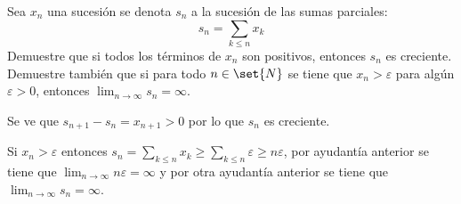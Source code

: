 \documentclass{ayudantia}
\begin{document}
\begin{prob}
    Sea \(x_n\) una sucesión se denota \(s_n\) a la sucesión de las sumas parciales:
    \begin{equation*}
        s_n=\sum_{k\leq n}x_k
    \end{equation*}
    Demuestre que si todos los términos de \(x_n\) son positivos, entonces \(s_n\) es creciente. Demuestre también que si para todo \(n\in\set{N}\) se tiene que \(x_n>\varepsilon\) para algún \(\varepsilon>0\), entonces \(\lim_{n\rightarrow\infty}s_n=\infty\).
\end{prob}

\begin{ans}
    \begin{sol}
        Se ve que \(s_{n+1}-s_n=x_{n+1}>0\) por lo que \(s_n\) es creciente.

        Si \(x_n>\varepsilon\) entonces \(s_n=\sum_{k\leq n}x_k\geq\sum_{k\leq n}\varepsilon\geq n\varepsilon\), por ayudantía anterior se tiene que \(\lim_{n\rightarrow\infty}n\varepsilon=\infty\) y por otra ayudantía anterior se tiene que \(\lim_{n\rightarrow\infty}s_n=\infty\).
    \end{sol}
\end{ans}
\end{document}
